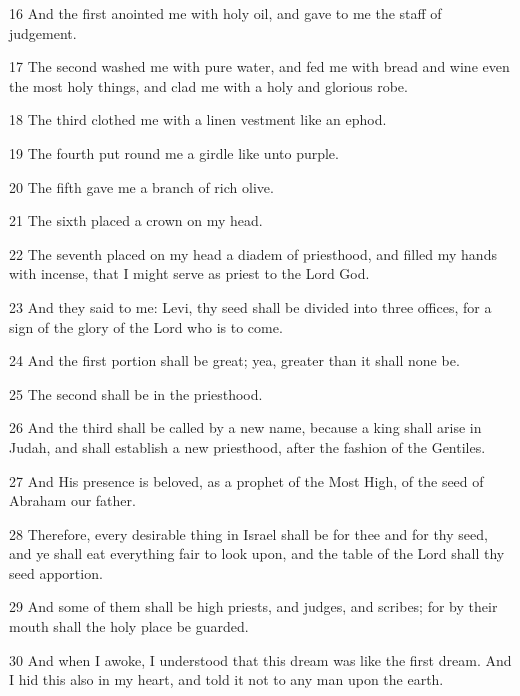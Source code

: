 \par 16 And the first anointed me with holy oil, and gave to me the staff of judgement.

\par 17 The second washed me with pure water, and fed me with bread and wine even the most holy things, and clad me with a holy and glorious robe.

\par 18 The third clothed me with a linen vestment like an ephod.

\par 19 The fourth put round me a girdle like unto purple.

\par 20 The fifth gave me a branch of rich olive.

\par 21 The sixth placed a crown on my head.

\par 22 The seventh placed on my head a diadem of priesthood, and filled my hands with incense, that I might serve as priest to the Lord God.

\par 23 And they said to me: Levi, thy seed shall be divided into three offices, for a sign of the glory of the Lord who is to come.

\par 24 And the first portion shall be great; yea, greater than it shall none be.

\par 25 The second shall be in the priesthood.

\par 26 And the third shall be called by a new name, because a king shall arise in Judah, and shall establish a new priesthood, after the fashion of the Gentiles.

\par 27 And His presence is beloved, as a prophet of the Most High, of the seed of Abraham our father.

\par 28 Therefore, every desirable thing in Israel shall be for thee and for thy seed, and ye shall eat everything fair to look upon, and the table of the Lord shall thy seed apportion.

\par 29 And some of them shall be high priests, and judges, and scribes; for by their mouth shall the holy place be guarded.

\par 30 And when I awoke, I understood that this dream was like the first dream. And I hid this also in my heart, and told it not to any man upon the earth.

